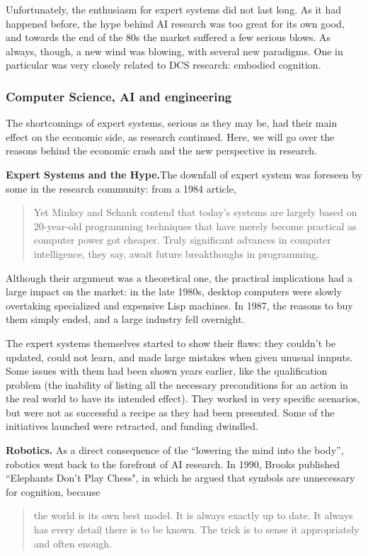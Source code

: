 \documentclass[../main.tex]{subfiles}
\begin{document}
Unfortunately, the enthusiasm for expert systems did not last long. As it had happened before, the hype behind AI research was too great for its own good, and towards the end of the 80s the market suffered a few serious blows. As always, though, a new wind was blowing, with several new paradigms. One in particular was very closely related to DCS research: embodied cognition.

\subsubsection{Computer Science, AI and engineering}
The shortcomings of expert systems, serious as they may be, had their main effect on the economic side, as research continued. Here, we will go over the reasons behind the economic crash and the new perspective in research.

\vspace{4pt}
\textbf{Expert Systems and the Hype.}The downfall of expert system was foreseen by some in the research community: from a 1984 article\cite{universityWhyComputersCan1984},
\begin{quote}
    Yet Minksy and Schank contend that today's systems are largely based on 20-year-old programming techniques that have merely become practical as computer power got cheaper. Truly significant advances in computer intelligence, they say, await future breakthoughs in programming.
\end{quote}

Although their argument was a theoretical one, the practical implications had a large impact on the market: in the late 1980s, desktop computers were slowly overtaking specialized and expensive Lisp machines. In 1987, the reasons to buy them simply ended, and a large industry fell overnight.

The expert systems themselves started to show their flaws: they couldn't be updated, could not learn, and made large mistakes when given unusual innputs. Some issues with them had been shown years earlier, like the qualification problem (the inability of listing all the necessary preconditions for an action in the real world to have its intended effect). They worked in very specific scenarios, but were not as successful a recipe as they had been presented. Some of the initiatives launched were retracted, and funding dwindled\cite{mccorduckMachinesWhoThink2004}.

\vspace{4pt}
\textbf{Robotics.} As a direct consequence of the ``lowering the mind into the body'', robotics went back to the forefront of AI research. In 1990, Brooks published ``Elephants Don't Play Chess"\cite{brooksElephantsDonPlay1990}, in which he argued that symbols are unnecessary for cognition, because
\begin{quote}
    the world is its own best model. It is always exactly up to date. It always has every detail there is to be known. The trick is to sense it appropriately and often enough.
\end{quote}
\end{document}
